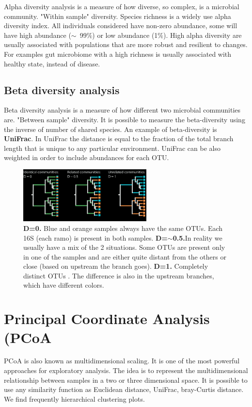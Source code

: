 Alpha diversity analysis is a measure of how diverse, so complex, is a microbial community. "Within sample" diversity. Species richness is a widely use alpha diversity index. 
All individuals considered have non-zero abundance, some will have high abundance ($\sim$~99$\%$) or low abundance (1$\%$). High alpha diversity are usually associated with populations that are more robust and resilient to changes.
For examples gut microbiome with a high richness is usually associated with healthy state, instead of disease. 

\subsection{Beta diversity analysis}

Beta diversity analysis is a measure of how different two microbial communities are. "Between sample" diversity. It is possible to measure the beta-diversity using the inverse of number of shared species.
An example of beta-diversity is \textbf{UniFrac}. In UniFrac the distance is equal to the fraction of the total branch length that is unique to any particular environment. UniFrac can be also weighted in order to include abundances for each OTU.

\begin{figure}[h]
\centering
\includegraphics[width=0.6\textwidth]{UniFrac.png}
\caption{\textbf{D=0.} Blue and orange samples always have the same OTUs. Each 16S (each ramo) is present in both samples. \textbf{D=$\sim$0.5.}In reality we usually have a mix of the 2 situations. Some OTUs are present only in one of the samples and are either quite distant from the others or close (based on upstream the branch goes). \textbf{D=1.} Completely distinct OTUs . The difference is also in the upstream branches, which have different colors.}
\end{figure}

\section{Principal Coordinate Analysis (PCoA}

PCoA is also known as multidimensional scaling. It is one of the most powerful approaches for exploratory analysis. The idea is to represent the multidimensional relationship between samples in a two or three dimensional space. It is possible to use any similarity function as Euclidean distance, UniFrac, bray-Curtis distance. We find frequently hierarchical clustering plots. 

